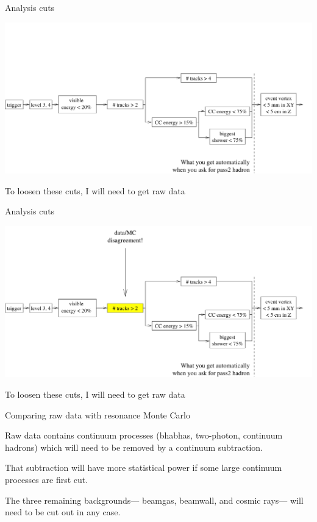\documentclass[landscape]{article}
\begin{document}
\pagebreak

{\Huge Analysis cuts}

\begin{center}
\includegraphics[width=\linewidth]{cuts0.pdf}
\end{center}
\vfill

To loosen these cuts, I will need to get raw data
\vfill
\pagebreak

{\Huge Analysis cuts}

\begin{center}
\includegraphics[width=\linewidth]{cuts.pdf}
\end{center}
\vfill

To loosen these cuts, I will need to get raw data
\vfill
\pagebreak

{\Huge Comparing raw data with resonance Monte Carlo}

\vfill
\begin{center}\begin{minipage}{0.85\linewidth}
Raw data contains continuum processes (bhabhas, two-photon, continuum
hadrons) which will need to be removed by a continuum subtraction.

\vspace{1 cm}
That subtraction will have more statistical power if some large
continuum processes are first cut.

\vspace{1 cm}
The three remaining backgrounds--- beamgas, beamwall, and cosmic
rays--- will need to be cut out in any case.
\end{minipage}\end{center}
\end{document}
